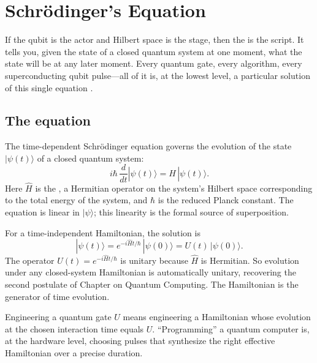 \chapter{Schr\"odinger's Equation}


If the qubit is the actor and Hilbert space is the stage, then the  is the script. It tells you, given the state of a closed quantum system at one moment, what the state will be at any later moment. Every quantum gate, every algorithm, every superconducting qubit pulse---all of it is, at the lowest level, a particular solution of this single equation \citep{schrodinger_undulatory_1926}.

\section{The equation}

The time-dependent Schr\"odinger equation governs the evolution of the state $|\psi(t)\rangle$ of a closed quantum system:
\[
  i\hbar\,\frac{d}{dt}|\psi(t)\rangle = \hat H\,|\psi(t)\rangle.
\]
Here $\hat H$ is the , a Hermitian operator on the system's Hilbert space corresponding to the total energy of the system, and $\hbar$ is the reduced Planck constant. The equation is linear in $|\psi\rangle$; this linearity is the formal source of superposition.

For a time-independent Hamiltonian, the solution is
\[
  |\psi(t)\rangle = e^{-i\hat H t/\hbar}\,|\psi(0)\rangle = U(t)\,|\psi(0)\rangle.
\]
The operator $U(t) = e^{-i\hat H t/\hbar}$ is unitary because $\hat H$ is Hermitian. So evolution under any closed-system Hamiltonian is automatically unitary, recovering the second postulate of Chapter on Quantum Computing. The Hamiltonian is the generator of time evolution.

\begin{remark}
Engineering a quantum gate $U$ means engineering a Hamiltonian whose evolution at the chosen interaction time equals $U$. ``Programming'' a quantum computer is, at the hardware level, choosing pulses that synthesize the right effective Hamiltonian over a precise duration.
\end{remark}


